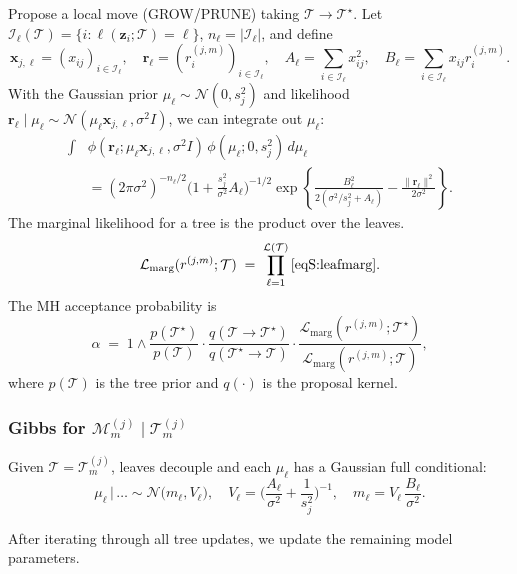 \documentclass[11pt]{article}
\newcommand{\calL}{\mathcal{L}}
\newcommand{\calM}{\mathcal{M}}
\newcommand{\calT}{\mathcal{T}}
\newcommand{\calI}{\mathcal{I}}
\newcommand{\bx}{\bm{x}}
\newcommand{\bz}{\bm{z}}
\newcommand{\br}{\bm{r}}
\theoremstyle{plain}
\theoremstyle{definition}
\theoremstyle{plain}
\begin{document}
Propose a local move (GROW/PRUNE) taking $\calT\to\calT^\star$.
Let $\calI_\ell(\calT)=\{i:\ell(\bz_i;\calT)=\ell\}$, $n_\ell=|\calI_\ell|$, and define
\[
\bx_{j,\ell}=(x_{ij})_{i\in\calI_\ell},\quad \br_\ell=(r_i^{(j,m)})_{i\in\calI_\ell},\quad
A_\ell=\sum_{i\in\calI_\ell} x_{ij}^2,\quad B_\ell=\sum_{i\in\calI_\ell} x_{ij} r_i^{(j,m)}.
\]
With the Gaussian prior $\mu_\ell\sim \mathcal N(0,s_j^2)$ and likelihood
$\br_\ell\mid \mu_\ell\sim \mathcal N(\mu_\ell\bx_{j,\ell},\sigma^2 I)$, we can integrate out $\mu_\ell$:
\begin{align}
\label{eqS:leafmarg}
\int &\phi(\br_\ell; \mu_\ell\bx_{j,\ell}, \sigma^2 I)\,\phi(\mu_\ell;0,s_j^2)\,d\mu_\ell \\
&= (2\pi\sigma^2)^{-n_\ell/2}\Big(1+\tfrac{s_j^2}{\sigma^2}A_\ell\Big)^{-1/2}
\exp\!\left\{\frac{B_\ell^2}{2(\sigma^2/s_j^2 + A_\ell)} - \frac{\|\br_\ell\|^2}{2\sigma^2}\right\}. \nonumber
\end{align}
The marginal likelihood for a tree is the product over the leaves.
\begin{equation}
\label{eqS:treemarg}
\mathcal L_{\text{marg}}(r^{(j,m)};\calT) \;=\; \prod_{\ell=1}^{\calL(\calT)} \text{\eqref{eqS:leafmarg}}.
\end{equation}
The MH acceptance probability is
\begin{equation}
\label{eqS:MHacc}
\alpha \;=\; 1\wedge \frac{p(\calT^\star)}{p(\calT)} \cdot \frac{q(\calT\to \calT^\star)}{q(\calT^\star\to \calT)}
\cdot \frac{\mathcal L_{\text{marg}}(r^{(j,m)};\calT^\star)}{\mathcal L_{\text{marg}}(r^{(j,m)};\calT)},
\end{equation}
where $p(\calT)$ is the tree prior and $q(\cdot)$ is the proposal kernel.

\subsubsection*{Gibbs for $\calM^{(j)}_m\mid \calT^{(j)}_m$}

Given $\calT=\calT^{(j)}_m$, leaves decouple and each $\mu_\ell$ has a Gaussian full conditional:
\begin{equation}
\label{eqS:leafpost}
\mu_\ell \,\big|\, \ldots \sim \mathcal N\!\big(m_\ell,V_\ell\big),\quad
V_\ell = \Big(\frac{A_\ell}{\sigma^2}+\frac{1}{s_j^2}\Big)^{-1},\quad
m_\ell = V_\ell\,\frac{B_\ell}{\sigma^2}.
\end{equation}

After iterating through all tree updates, we update the remaining model parameters.
\end{document}
